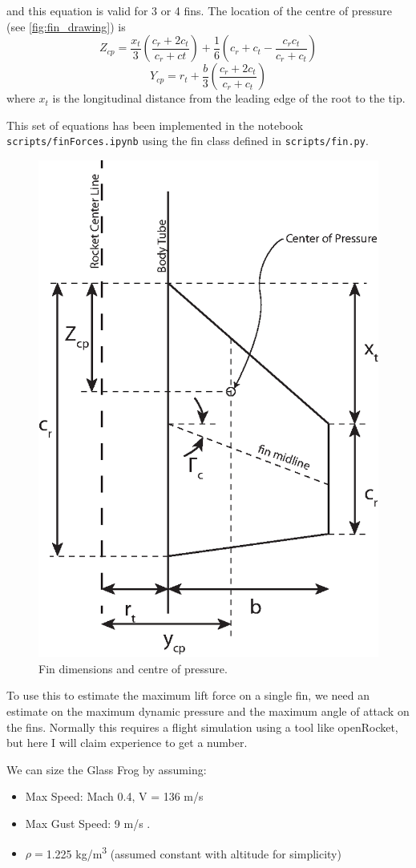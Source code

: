 \documentclass[11pt]{article}
\newcommand{\eqn}[1]{\begin{equation}#1\end{equation}}
\begin{document}
and this equation is valid for 3 or 4 fins. 
The location of the centre of pressure (see \autoref{fig:fin_drawing}) is
\eqn{
Z_{cp} = \frac{x_t}{3} \left(\frac{c_r + 2 c_t}{c_r + ct}\right) + \frac{1}{6} \left(c_r + c_t - \frac{c_r c_t}{c_r + c_t}\right)
}
\eqn{
Y_{cp} = r_t + \frac{b}{3} \left(\frac{c_r + 2 c_t}{c_r + c_t}\right)}
where $x_t$ is the longitudinal distance from the leading edge of the root to the tip. 

This set of equations has been implemented in the notebook \texttt{scripts/finForces.ipynb} using the fin class defined in \texttt{scripts/fin.py}.


\begin{figure}[tbhp]
   \centering
   \includegraphics[width=0.5\linewidth]{figs/fin_drawing.eps}
   \caption{Fin dimensions and centre of pressure.}
   \label{fig:fin_drawing}
\end{figure}


To use this to estimate the maximum lift force on a single fin, we need an estimate on the maximum dynamic pressure and the maximum angle of attack on the fins. Normally this requires a flight simulation using a tool like openRocket, but here I will claim experience to get a number. 

We can size the Glass Frog by assuming:
\begin{itemize}
\item Max Speed: Mach 0.4, V = 136 m/s 
\item Max Gust Speed: 9 m/s  \cite{aspire_space_loads}. 
\item $\rho=$1.225 kg/m\textsuperscript{3} (assumed constant with altitude for simplicity)
\end{itemize}
\end{document}

